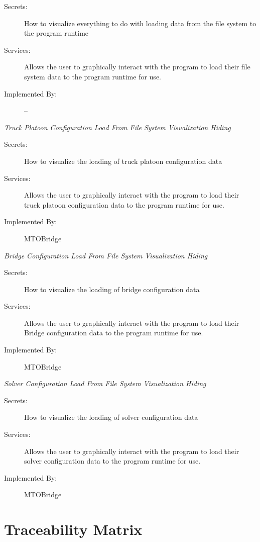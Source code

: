 \documentclass[12pt, titlepage]{article}
\begin{document}
    \begin{description}
        \item[Secrets:]How to visualize everything to do with loading data from the file system to the program runtime
        \item[Services:]Allows the user to graphically interact with the program to load their file system data to the program runtime for use.
        \item[Implemented By:] --\\
    \end{description}
    \emph{{\large Truck Platoon Configuration Load From File System Visualization Hiding}}
    \begin{description}
        \item[Secrets:]How to visualize the loading of truck platoon configuration data
        \item[Services:]Allows the user to graphically interact with the program to load their truck platoon configuration data to the program runtime for use.
        \item[Implemented By:] MTOBridge\\
    \end{description}
    \emph{{\large Bridge Configuration Load From File System Visualization Hiding}}
    \begin{description}
        \item[Secrets:]How to visualize the loading of bridge configuration data
        \item[Services:]Allows the user to graphically interact with the program to load their Bridge configuration data to the program runtime for use.
        \item[Implemented By:] MTOBridge\\
    \end{description}
    \emph{{\large Solver Configuration Load From File System Visualization Hiding}}
    \begin{description}
        \item[Secrets:]How to visualize the loading of solver configuration data
        \item[Services:]Allows the user to graphically interact with the program to load their solver configuration data to the program runtime for use.
        \item[Implemented By:] MTOBridge\\
    \end{description}


\section{Traceability Matrix} \label{SecTM}
\end{document}
